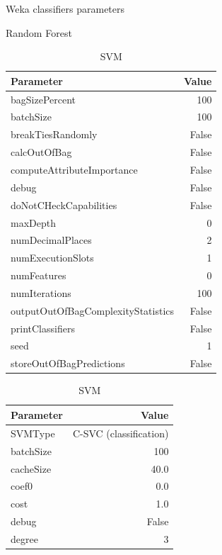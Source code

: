 \begin{table}[H]
    \caption{Weka classifiers parameters} \label{tab:weka_params}
    \scriptsize
    \centering
    \begin{subtable}[t]{.37\linewidth}
        \caption{Random Forest \cite{noauthor_randomforest_nodate}}
        \centering
        \begin{tabular}{lr}\toprule
            Parameter & Value \\\midrule
            bagSizePercent & 100\\
            batchSize & 100 \\
            breakTiesRandomly & False \\
            calcOutOfBag & False \\
            computeAttributeImportance & False \\
            debug & False \\
            doNotCHeckCapabilities & False \\
            maxDepth & 0 \\
            numDecimalPlaces & 2 \\
            numExecutionSlots & 1 \\
            numFeatures & 0 \\
            numIterations & 100 \\
            outputOutOfBagComplexityStatistics & False \\
            printClassifiers & False \\
            seed & 1 \\
            storeOutOfBagPredictions & False \\\bottomrule
        \end{tabular}
    \end{subtable}%
    \begin{subtable}[t]{.37\linewidth}
        \caption{SVM \cite{noauthor_libsvm_nodate}}
        \centering
        \begin{tabular}{lr}\toprule
            Parameter & Value \\\midrule
            SVMType & C-SVC (classification) \\
            batchSize & 100 \\
            cacheSize & 40.0 \\
            coef0 & 0.0 \\
            cost & 1.0 \\
            debug & False \\
            degree & 3 \\

\end{tabular}
\end{subtable}
\end{table}

